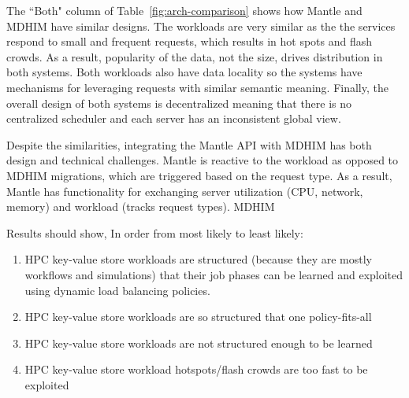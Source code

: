 The ``Both" column of Table~\ref{fig:arch-comparison} shows how Mantle and
MDHIM have similar designs. The workloads are very similar as the the services
respond to small and frequent requests, which results in hot spots and flash
crowds. As a result, popularity of the data, not the size, drives distribution
in both systems. Both workloads also have data locality so the systems have
mechanisms for leveraging requests with similar semantic meaning.  Finally, the
overall design of both systems is decentralized meaning that there is no
centralized scheduler and each server has an inconsistent global view.

Despite the similarities, integrating the Mantle API with MDHIM has both design
and technical challenges. Mantle is reactive to the workload as opposed to
MDHIM migrations, which are triggered based on the request type. As a result,
Mantle has functionality for exchanging server utilization (CPU, network,
memory) and workload (tracks request types). MDHIM 





Results should show, In order from most likely to least likely:

\begin{enumerate}

  \item HPC key-value store workloads are structured (because they are mostly
  workflows and simulations) that their job phases can be learned and exploited
  using dynamic load balancing policies.

  \item HPC key-value store workloads are so structured that one
  policy-fits-all

  \item HPC key-value store workloads are not structured enough to be learned

  \item HPC key-value store workload hotspots/flash crowds are too fast to be
  exploited

\end{enumerate}
